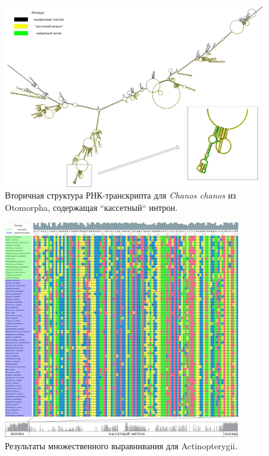 \begin{figure}
    \centering
    \includegraphics[width=0.9\textheight]{images/Chanos_chanos_2nd_structure}
    \caption{Вторичная структура РНК-транскрипта для \textit{Chanos chanos} из Otomorpha, содержащая ``кассетный`` интрон.}
    \label{fig:Chanos_chanos_2nd_structure}
\end{figure}

\begin{figure}[ht] %
    \centering
    \includegraphics[width=0.9\textwidth]{images/Actinopterygii_alignment_ruler}
    \caption{Результаты множественного выравнивания для Actinopterygii.}
    \label{fig:Actinopterygii_alignment_ruler}
\end{figure}

